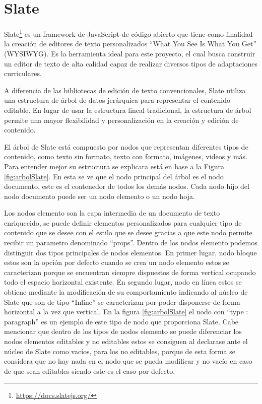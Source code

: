 \section{Slate}\label{sec:Slate}
Slate\footnote{\url{https://docs.slatejs.org/}} es un framework de JavaScript de código abierto que tiene como finalidad la creación de editores de texto personalizados ``What You See Is What You Get'' (WYSIWYG). Es la herramienta ideal para este proyecto, el cual busca construir un editor de texto de alta calidad capaz de realizar diversos tipos de adaptaciones curriculares.

A diferencia de las bibliotecas de edición de texto convencionales, Slate utiliza una estructura de árbol de datos jerárquica para representar el contenido editable. En lugar de usar la estructura lineal tradicional, la estructura de árbol permite una mayor flexibilidad y personalización en la creación y edición de contenido.

El árbol de Slate está compuesto por nodos que representan diferentes tipos de contenido, como texto sin formato, texto con formato, imágenes, videos y más. Para entender mejor su estructura se explicara está en base a la Figura \ref{fig:arbolSlate}. En esta se ve que el nodo principal del árbol es el nodo documento, este es el contenedor de todos los demás nodos. Cada nodo hijo del nodo documento puede ser un nodo elemento o un nodo hoja.

Los nodos elemento son la capa intermedia de un documento de texto enriquecido, se puede definir elementos personalizados para cualquier tipo de contenido que se desee con el estilo que se desee gracias a que este nodo permite recibir un parametro denominado ``props''. Dentro de los nodos elemento podemos distinguir dos tipos principales de nodos elementos. En primer lugar, nodo bloque estos son la opción por defecto cuando se crea un nodo elemento estos se caracterizan porque se encuentran siempre dispuestos de forma vertical ocupando todo el espacio horizontal existente. En segundo lugar, nodo en línea estos se obtiene mediante la modificación de su comportamiento indicando al núcleo de Slate que son de tipo ``Inline'' se caracterizan por poder disponerse de forma horizontal a la vez que vertical. En la figura \ref{fig:arbolSlate}  el nodo con ``type : paragraph'' es un ejemplo de este tipo de nodo que proporciona Slate. Cabe mencionar que dentro de los tipos de nodos elemento se puede diferenciar los nodos elementos editables y no editables estos se consiguen al declarase ante el núcleo de Slate como vacíos, para los no editables, porque de esta forma se considera que no hay nada en el nodo que se pueda modificar y no vacío en caso de que sean editables siendo este es el caso por defecto.

